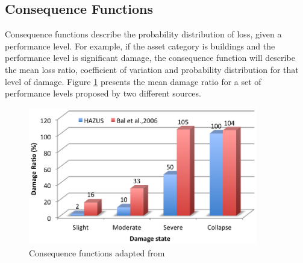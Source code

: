 \subsection{Consequence Functions}
Consequence functions describe the probability distribution of loss, given a performance level. For example, if the asset category is buildings and the performance level is significant damage, the consequence function will describe the mean loss ratio, coefficient of variation and probability distribution for that level of damage. Figure \ref{fig:ConsequenceFunctions} presents the mean damage ratio for a set of performance levels proposed by two different sources. 

\begin{figure}[ht]
\centering
\includegraphics[width=10cm,height=6cm]{./Figures/Part_Risk/ConsequenceFunction.eps}
\caption{Consequence functions adapted from  \citet{Baletal2010}}
\label{fig:ConsequenceFunctions}
\end{figure}


